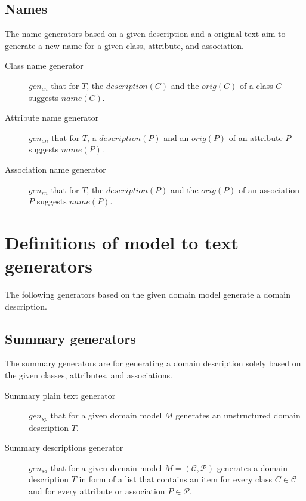 \subsection{Names}

The name generators based on a given description and a original text aim to generate a new name for a given class, attribute, and association.

\begin{description}
\item [Class name generator] $gen_{cn}$ that for $T$, the $description(C)$ and the $orig(C)$ of a class $C$ suggests  $name(C)$.

\item [Attribute name generator] $gen_{an}$ that for $T$,  a $description(P)$ and an $orig(P)$ of an attribute $P$ suggests $name(P)$.

\item [Association name generator] $gen_{rn}$ that for $T$, the $description(P)$ and the $orig(P)$ of an association $P$ suggests $name(P)$.
\end{description}


\section{Definitions of model to text generators}

The following generators based on the given domain model generate a domain description.

\subsection{Summary generators}

The summary generators are for generating a domain description solely based on the given classes, attributes, and associations.

\begin{description}
\item [Summary plain text generator] $gen_{sp}$ that for a given domain model $M$ generates an unstructured domain description $T$.

\item [Summary descriptions generator] $gen_{sd}$ that for a given domain model $M = (\mathcal{C}, \mathcal{P})$ generates a domain description $T$ in form of a list that contains an item for every class $C \in \mathcal{C}$ and for every attribute or association $P \in\mathcal{P}$.
\end{description}


